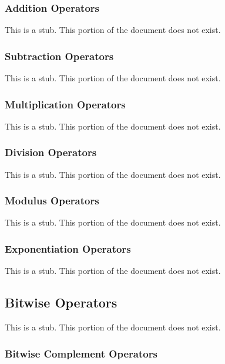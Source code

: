 \subsubsection{Addition Operators}
\label{Addition_Operators}

This is a stub.  This portion of the document does not exist.

\subsubsection{Subtraction Operators}
\label{Subtraction_Operators}

This is a stub.  This portion of the document does not exist.

\subsubsection{Multiplication Operators}
\label{Multiplication_Operators}

This is a stub.  This portion of the document does not exist.

\subsubsection{Division Operators}
\label{Division_Operators}

This is a stub.  This portion of the document does not exist.

\subsubsection{Modulus Operators}
\label{Modulus_Operators}

This is a stub.  This portion of the document does not exist.

\subsubsection{Exponentiation Operators}
\label{Exponentiation_Operators}

This is a stub.  This portion of the document does not exist.

\subsection{Bitwise Operators}
\label{Bitwise_Operators}

This is a stub.  This portion of the document does not exist.

\subsubsection{Bitwise Complement Operators}
\label{Bitwise_Complement_Operators}

